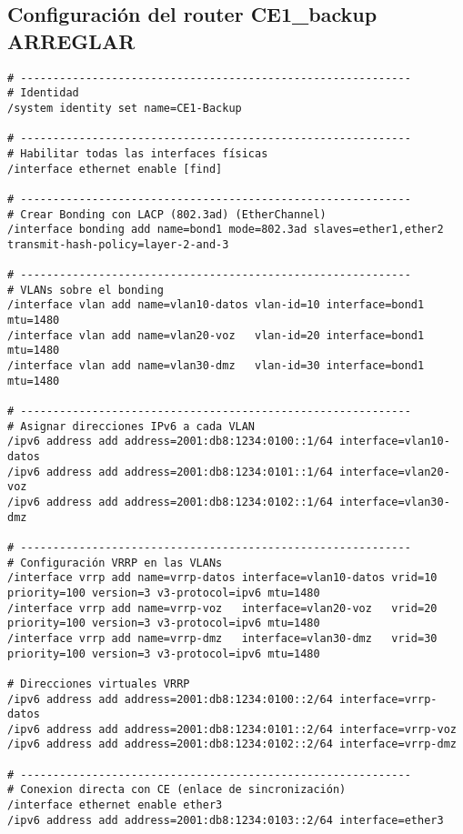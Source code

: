 \subsection{Configuración del router CE1\_backup ARREGLAR}
\label{Apendice2:configuracion_ce1_backup}
\begin{lstlisting}[language=RouterOS]
# ------------------------------------------------------------
# Identidad
/system identity set name=CE1-Backup

# ------------------------------------------------------------
# Habilitar todas las interfaces físicas
/interface ethernet enable [find]

# ------------------------------------------------------------
# Crear Bonding con LACP (802.3ad) (EtherChannel)
/interface bonding add name=bond1 mode=802.3ad slaves=ether1,ether2 transmit-hash-policy=layer-2-and-3

# ------------------------------------------------------------
# VLANs sobre el bonding
/interface vlan add name=vlan10-datos vlan-id=10 interface=bond1 mtu=1480
/interface vlan add name=vlan20-voz   vlan-id=20 interface=bond1 mtu=1480
/interface vlan add name=vlan30-dmz   vlan-id=30 interface=bond1 mtu=1480

# ------------------------------------------------------------
# Asignar direcciones IPv6 a cada VLAN
/ipv6 address add address=2001:db8:1234:0100::1/64 interface=vlan10-datos
/ipv6 address add address=2001:db8:1234:0101::1/64 interface=vlan20-voz
/ipv6 address add address=2001:db8:1234:0102::1/64 interface=vlan30-dmz

# ------------------------------------------------------------
# Configuración VRRP en las VLANs
/interface vrrp add name=vrrp-datos interface=vlan10-datos vrid=10 priority=100 version=3 v3-protocol=ipv6 mtu=1480
/interface vrrp add name=vrrp-voz   interface=vlan20-voz   vrid=20 priority=100 version=3 v3-protocol=ipv6 mtu=1480 
/interface vrrp add name=vrrp-dmz   interface=vlan30-dmz   vrid=30 priority=100 version=3 v3-protocol=ipv6 mtu=1480

# Direcciones virtuales VRRP
/ipv6 address add address=2001:db8:1234:0100::2/64 interface=vrrp-datos
/ipv6 address add address=2001:db8:1234:0101::2/64 interface=vrrp-voz
/ipv6 address add address=2001:db8:1234:0102::2/64 interface=vrrp-dmz

# ------------------------------------------------------------
# Conexion directa con CE (enlace de sincronización)
/interface ethernet enable ether3
/ipv6 address add address=2001:db8:1234:0103::2/64 interface=ether3


\end{lstlisting}
